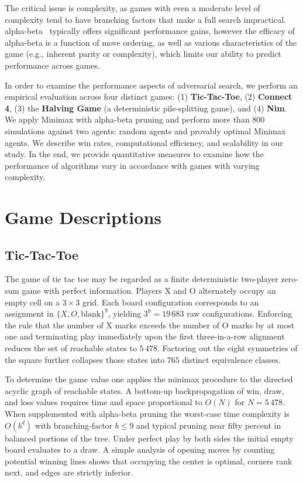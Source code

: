 \documentclass[12pt]{article}
\begin{document}
The critical issue is complexity, as games with even a moderate level of complexity tend to have branching factors that make a full search impractical. \Gls{alpha-beta} \ typically offers significant performance gains, however the efficacy of alpha-beta is a function of move ordering, as well as various characteristics of the game (e.g., inherent parity or complexity), which limits our ability to predict performance across games.

In order to examine the performance aspects of adversarial search, we perform an empirical evaluation across four distinct games: (1) \textbf{Tic-Tac-Toe}, (2) \textbf{Connect 4}, (3) the \textbf{Halving Game} (a deterministic pile-splitting game), and (4) \textbf{Nim}. We apply Minimax with alpha-beta pruning and perform more than 800 simulations against two agents: random agents and provably optimal Minimax agents. We describe win rates, computational efficiency, and scalability in our study. In the end, we provide quantitative measures to examine how the performance of algorithms vary in accordance with games with varying complexity.


\section{Game Descriptions}

\subsection{Tic-Tac-Toe}

The game of tic tac toe may be regarded as a finite deterministic two-player zero-sum game with perfect information. Players X and O alternately occupy an empty cell on a $3\times3$ grid. Each board configuration corresponds to an assignment in $\{X,O,\mathrm{blank}\}^9$, yielding $3^9 = 19\,683$ raw configurations. Enforcing the rule that the number of X marks exceeds the number of O marks by at most one and terminating play immediately upon the first three-in-a-row alignment reduces the set of reachable states to $5\,478$. Factoring out the eight symmetries of the square further collapses those states into $765$ distinct equivalence classes.

To determine the game value one applies the minimax procedure to the directed acyclic graph of reachable states. A bottom-up backpropagation of win, draw, and loss values requires time and space proportional to $O(N)$ for $N=5\,478$. When supplemented with alpha-beta pruning the worst-case time complexity is $O(b^d)$ with \gls{branching-factor} $b\le9$ and typical pruning near fifty percent in balanced portions of the tree. Under perfect play by both sides the initial empty board evaluates to a draw. A simple analysis of opening moves by counting potential winning lines shows that occupying the center is optimal, corners rank next, and edges are strictly inferior.
\end{document}
